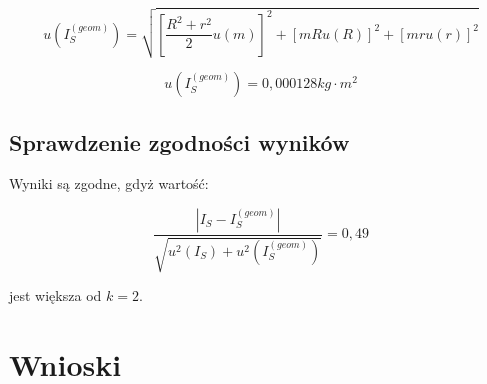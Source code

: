 \documentclass[a4paper,10pt,twoside]{article}
\begin{document}
$$ u(I_S^{(geom)}) = \sqrt{ \left[ \frac{R^2 + r^2}{2} u(m) \right]^2 + \left[ mRu(R) \right]^2 + \left[ mru(r) \right]^2 } $$


$$ u(I_S^{(geom)}) = 0,000128 \unit{kg \cdot m^2} $$

\subsection{Sprawdzenie zgodności wyników}

Wyniki są zgodne, gdyż wartość:

$$ \frac{ \left| I_S - I_S^{(geom)} \right| }{\sqrt{u^2(I_S) + u^2(I_S^{(geom)})}} = 0,49 $$

jest większa od $k = 2$.


\section{Wnioski}
\end{document}
